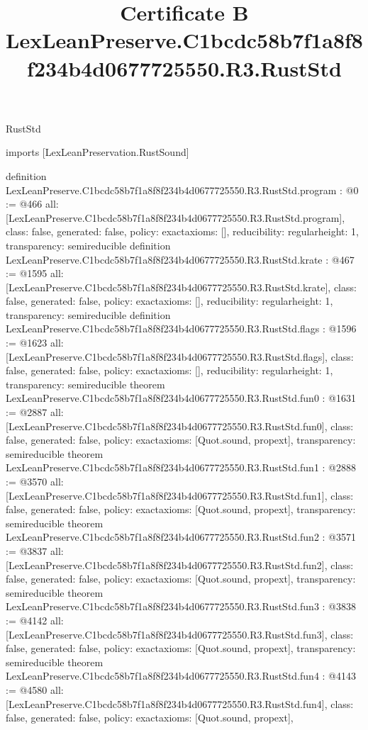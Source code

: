 \begin{lexlean}{RustStd}
\title{Certificate B LexLeanPreserve.C1bcdc58b7f1a8f8f234b4d0677725550.R3.RustStd}
\begin{coremodule}
imports [LexLeanPreservation.RustSound]

definition LexLeanPreserve.C1bcdc58b7f1a8f8f234b4d0677725550.R3.RustStd.program : @0 := @466 {
  all: [LexLeanPreserve.C1bcdc58b7f1a8f8f234b4d0677725550.R3.RustStd.program],
  class: false,
  generated: false,
  policy: exact{axioms: []},
  reducibility: regular{height: 1},
  transparency: semireducible
}
definition LexLeanPreserve.C1bcdc58b7f1a8f8f234b4d0677725550.R3.RustStd.krate : @467 := @1595 {
  all: [LexLeanPreserve.C1bcdc58b7f1a8f8f234b4d0677725550.R3.RustStd.krate],
  class: false,
  generated: false,
  policy: exact{axioms: []},
  reducibility: regular{height: 1},
  transparency: semireducible
}
definition LexLeanPreserve.C1bcdc58b7f1a8f8f234b4d0677725550.R3.RustStd.flags : @1596 := @1623 {
  all: [LexLeanPreserve.C1bcdc58b7f1a8f8f234b4d0677725550.R3.RustStd.flags],
  class: false,
  generated: false,
  policy: exact{axioms: []},
  reducibility: regular{height: 1},
  transparency: semireducible
}
theorem LexLeanPreserve.C1bcdc58b7f1a8f8f234b4d0677725550.R3.RustStd.fun0 : @1631 := @2887 {
  all: [LexLeanPreserve.C1bcdc58b7f1a8f8f234b4d0677725550.R3.RustStd.fun0],
  class: false,
  generated: false,
  policy: exact{axioms: [Quot.sound, propext]},
  transparency: semireducible
}
theorem LexLeanPreserve.C1bcdc58b7f1a8f8f234b4d0677725550.R3.RustStd.fun1 : @2888 := @3570 {
  all: [LexLeanPreserve.C1bcdc58b7f1a8f8f234b4d0677725550.R3.RustStd.fun1],
  class: false,
  generated: false,
  policy: exact{axioms: [Quot.sound, propext]},
  transparency: semireducible
}
theorem LexLeanPreserve.C1bcdc58b7f1a8f8f234b4d0677725550.R3.RustStd.fun2 : @3571 := @3837 {
  all: [LexLeanPreserve.C1bcdc58b7f1a8f8f234b4d0677725550.R3.RustStd.fun2],
  class: false,
  generated: false,
  policy: exact{axioms: [Quot.sound, propext]},
  transparency: semireducible
}
theorem LexLeanPreserve.C1bcdc58b7f1a8f8f234b4d0677725550.R3.RustStd.fun3 : @3838 := @4142 {
  all: [LexLeanPreserve.C1bcdc58b7f1a8f8f234b4d0677725550.R3.RustStd.fun3],
  class: false,
  generated: false,
  policy: exact{axioms: [Quot.sound, propext]},
  transparency: semireducible
}
theorem LexLeanPreserve.C1bcdc58b7f1a8f8f234b4d0677725550.R3.RustStd.fun4 : @4143 := @4580 {
  all: [LexLeanPreserve.C1bcdc58b7f1a8f8f234b4d0677725550.R3.RustStd.fun4],
  class: false,
  generated: false,
  policy: exact{axioms: [Quot.sound, propext]},
}
\end{coremodule}
\end{lexlean}

